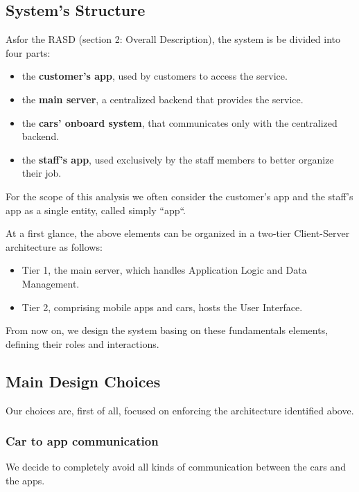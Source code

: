\documentclass[11pt]{article} %
\begin{document}
\begin{description}
\begin{description}
\end{description}






\subsection{System's Structure}

Asfor the RASD (section 2: Overall Description), the system is be divided into four parts:
\begin{itemize}[noitemsep]
	\item the \textbf{customer's app}, used by customers to access the service.
	\item the \textbf{main server}, a centralized backend that provides the service.
	\item the \textbf{cars’ onboard system}, that communicates only with the centralized backend.
	\item the \textbf{staff's app}, used exclusively by the staff members to better organize their job.
\end{itemize}

For the scope of this analysis we often consider the customer's app and the staff's app as a single entity, called simply ``app``.

At a first glance, the above elements can be organized in a two-tier Client-Server architecture as follows:
\begin{itemize}[noitemsep]
	\item Tier 1, the main server, which handles Application Logic and Data Management.
	\item Tier 2, comprising mobile apps and cars, hosts the User Interface.
\end{itemize}
From now on, we design the system basing on these fundamentals elements, defining their roles and interactions.




\subsection{Main Design Choices}

Our choices are, first of all, focused on enforcing the architecture identified above. 

\subsubsection{Car to app communication}
We decide to completely avoid all kinds of communication between the cars and the apps. 


\end{description}
\end{document}
